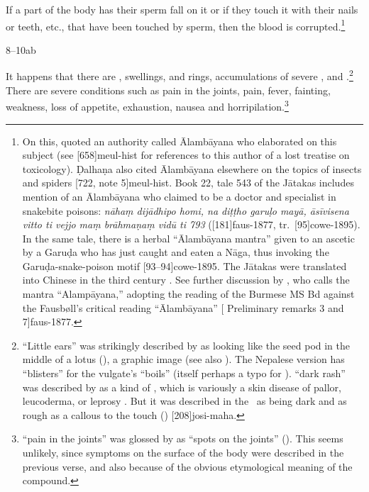 \begin{translation}
If a part of the body has their sperm fall on it or if they touch it
with their nails or teeth, etc., that have been touched by sperm,
then the blood is corrupted.\footnote{On this, 
    quoted an authority called Ālambāyana who elaborated on this subject
    (see [658]{meul-hist} for references to this author of a
    lost treatise on toxicology). Ḍalhaṇa also cited Ālambāyana elsewhere
    on the topics of insects and spiders [722, note
    5]{meul-hist}. Book 22, tale 543 of the Jātakas includes mention of
    an Ālambāyana who claimed to be a doctor and specialist in snakebite
    poisons: \emph{nāhaṃ dijādhipo homi, na diṭṭho garuḷo mayā, āsīvisena
    vitto ti vejjo maṃ brāhmaṇaṃ vidū ti 793}
    ([181]{faus-1877}, tr.\  [95]{cowe-1895}). In
    the same tale, there is a herbal “Ālambāyana mantra” given to an 
    ascetic by a Garuḍa who has just caught and eaten a Nāga, thus
    invoking the Garuḍa-snake-poison motif
    [93--94]{cowe-1895}.  The Jātakas were translated into
    Chinese in the third century \CE.
%    
%    
%    
    See further discussion by \citet[33--34]{slou-2016}, who calls the mantra 
    “Alampāyana,” adopting the reading of the Burmese MS Bd against the 
    Fausbøll's critical reading  “Ālambāyana”  [ 
    Preliminary remarks 3 and 7]{faus-1877}.}
    
\item[8--10ab]

It happens that there are , swellings,
 and rings, accumulations of
severe , 
and .\footnote{“Little ears”
    was strikingly described by  as looking like the
    seed pod in the middle of a lotus (),
    a graphic image (see also ). %
    The Nepalese version has  “blisters” for the
    vulgate's  “boils” (itself perhaps a typo for
    ).   “dark rash” was described by
     as a kind of , which is
    variously a skin disease of pallor, leucoderma, or leprosy
    \citep{emme-1984}. But it was described in the \CS\ as being dark
    and as rough as a callous to the touch ()
    [208]{josi-maha}.}  There are severe conditions such
    as pain in the joints, pain, fever, fainting, weakness, loss of
    appetite, exhaustion, nausea and
    horripilation.\footnote{ “pain in the joints” was
        glossed by  as “spots on the joints”
        ().  This seems unlikely, since symptoms on the 
        surface of the body were described in the previous verse, and also 
        because of the obvious etymological meaning of the compound.}
        


\end{translation}

